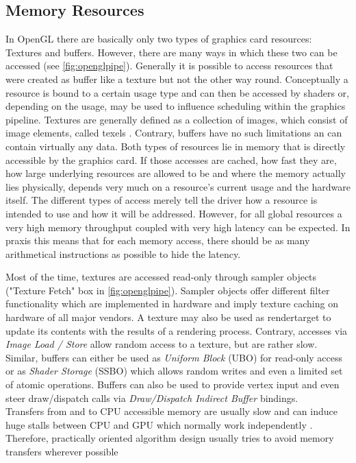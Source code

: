 \documentclass[thesis.tex]{subfiles}
\begin{document}
\subsection{Memory Resources} \label{sec:preq:memory}
In OpenGL there are basically only two types of graphics card resources: Textures and buffers.
However, there are many ways in which these two can be accessed (see \autoref{fig:openglpipe}).
Generally it is possible to access resources that were created as buffer like a texture but not the other way round.
Conceptually a resource is bound to a certain usage type and can then be accessed by shaders or, depending on the usage, may be used to influence scheduling within the graphics pipeline.
Textures are generally defined as a collection of images, which consist of image elements, called texels \cite[p.~29]{bib:openglspec}.
Contrary, buffers have no such limitations an can contain virtually any data.
Both types of resources lie in memory that is directly accessible by the graphics card.
If those accesses are cached, how fast they are, how large underlying resources are allowed to be and where the memory actually lies physically, depends very much on a resource's current usage and the hardware itself.
The different types of access merely tell the driver how a resource is intended to use and how it will be addressed.
However, for all global resources a very high memory throughput coupled with very high latency can be expected.
In praxis this means that for each memory access, there should be as many arithmetical instructions as possible to hide the latency.


Most of the time, textures are accessed read-only through sampler objects ("Texture Fetch" box in \autoref{fig:openglpipe}).
Sampler objects offer different filter functionality which are implemented in hardware and imply texture caching on hardware of all major vendors.
A texture may also be used as rendertarget to update its contents with the results of a rendering process.
Contrary, accesses via \emph{Image Load / Store} allow random access to a texture, but are rather slow.
\\
Similar, buffers can either be used as \emph{Uniform Block} (UBO) for read-only access or as \emph{Shader Storage} (SSBO) which allows random writes and even a limited set of atomic operations.
Buffers can also be used to provide vertex input and even steer draw/dispatch calls via \emph{Draw/Dispatch Indirect Buffer} bindings.
\\
Transfers from and to CPU accessible memory are usually slow and can induce huge stalls between CPU and GPU which normally work independently \cite{bib:openglinsightstransfer}.
Therefore, practically oriented algorithm design usually tries to avoid memory transfers wherever possible
\end{document}
